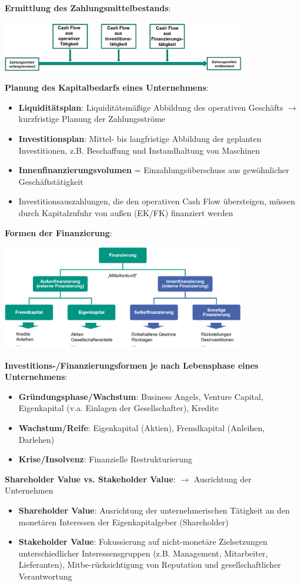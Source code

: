 \pagebreak
\textbf{Ermittlung des Zahlungsmittelbestands}:
\begin{center}
	\includegraphics[width=0.8\textwidth]{images/zbestand.png}
\end{center}
\bigskip
\textbf{Planung des Kapitalbedarfs eines Unternehmens}:
\begin{itemize}
	\item \textbf{Liquiditätsplan}: Liquiditätsmäßige Abbildung des operativen Geschäfts $\rightarrow$ kurzfristige Planung der Zahlungsströme
	\item \textbf{Investitionsplan}: Mittel- bis langfristige Abbildung der geplanten Investitionen, z.B. Beschaffung und Instandhaltung von Maschinen
	\item \textbf{Innenfinanzierungsvolumen} = Einzahlungsüberschuss aus gewöhnlicher Geschäftstätigkeit
	\item  Investitionsauszahlungen, die den operativen Cash Flow übersteigen, müssen durch Kapitalzufuhr von außen (EK/FK) finanziert werden
\end{itemize}
\bigskip
\textbf{Formen der Finanzierung}:
\begin{center}
	\includegraphics[width=0.8\textwidth]{images/finanzierung.png}
\end{center}
\textbf{Investitions-/Finanzierungsformen je nach Lebensphase eines Unternehmens}:
\begin{itemize}
	\item \textbf{Gründungsphase/Wachstum}: Business Angels, Venture Capital, Eigenkapital (v.a. Einlagen der Gesellschafter), Kredite
	\item \textbf{Wachstum/Reife}: Eigenkapital (Aktien), Fremdkapital (Anleihen, Darlehen)
	\item \textbf{Krise/Insolvenz}: Finanzielle Restrukturierung
\end{itemize}
\bigskip
\textbf{Shareholder Value vs. Stakeholder Value}: $\rightarrow$ Ausrichtung der Unternehmen
\begin{itemize}
	\item \textbf{Shareholder Value}: Ausrichtung der unternehmerischen Tätigkeit an den monetären Interessen der Eigenkapitalgeber (Shareholder)
	\item \textbf{Stakeholder Value}: Fokussierung auf nicht-monetäre Zielsetzungen unterschiedlicher Interessensgruppen (z.B. Management, Mitarbeiter, Lieferanten), Mitbe-rücksichtigung von Reputation und gesellschaftlicher Verantwortung
\end{itemize}